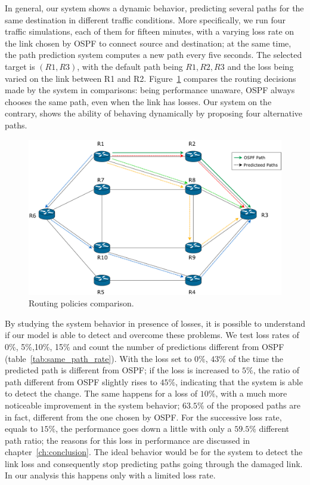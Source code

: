 In general, our system shows a dynamic behavior, predicting several paths for the same destination in different traffic conditions. More specifically, we run four traffic simulations, each of them for fifteen minutes, with a varying loss rate on the link chosen by OSPF to connect source and destination;  at the same time, the path prediction system computes a new path every five seconds. The selected target is $(R1, R3)$, with the default path being $R1,R2,R3$ and the loss being varied on the link between R1 and R2. Figure~\ref{fig:path_cmp} compares the routing decisions made by the system in comparisons: being performance unaware, OSPF always chooses the same path, even when the link has losses. Our system on the contrary, shows the ability of behaving dynamically by proposing four alternative paths.

\begin{figure}
\centering
\includegraphics[width=.97\textwidth]{img/path_comparison}
\caption{Routing policies comparison.}
\label{fig:path_cmp}
\end{figure}
By studying the system behavior in presence of losses, it is possible to understand if our model is able to detect and overcome these problems. We test loss rates of 0\%, 5\%,10\%, 15\% and count the number of predictions different from OSPF (table~\ref{tab:same_path_rate}). With the loss set to $0\%$, $43\%$ of the time the predicted path is different from OSPF; if the loss is increased to $5\%$, the ratio of path different from OSPF slightly rises to $45\%$, indicating that the system is able to detect the change. The same happens for a loss of $10\%$, with a much more noticeable improvement in the system behavior;  $63.5\%$ of the proposed paths are in fact, different from the one chosen by OSPF. For the successive loss rate, equals to $15\%$, the performance goes down a little with only a $59.5\%$ different path ratio; the reasons for this loss in performance are discussed in chapter~\ref{ch:conclusion}. The ideal behavior would be for the system to detect the link loss and consequently stop predicting paths going through the damaged link. In our analysis this happens only with a limited loss rate.



